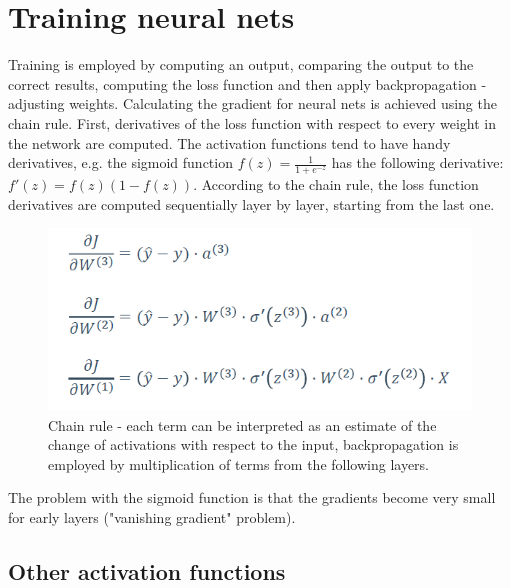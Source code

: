 \documentclass[11pt]{book}
\begin{document}
\section{Training neural nets}

Training is employed by computing an output, comparing the output to the correct results, computing the loss function and then apply backpropagation - adjusting weights. Calculating the gradient for neural nets is achieved using the chain rule. First, derivatives of the loss function with respect to every weight in the network are computed. The activation functions tend to have handy derivatives, e.g. the sigmoid function $f(z) = \frac{1}{1 + e^{-z}}$ has the following derivative: $f'(z) = f(z)(1-f(z))$. According to the chain rule, the loss function derivatives are computed sequentially layer by layer, starting from the last one. 

\begin{figure}[H]
    \centering
    \includegraphics[width=0.5\linewidth]{chain_rule.PNG}
    \caption{Chain rule - each term can be interpreted as an estimate of the change of activations with respect to the input, backpropagation is employed by multiplication of terms from the following layers.}
    \label{fig:my_label}
\end{figure}

The problem with the sigmoid function is that the gradients become very small for early layers ("vanishing gradient" problem).  

\subsection{Other activation functions}
\end{document}
